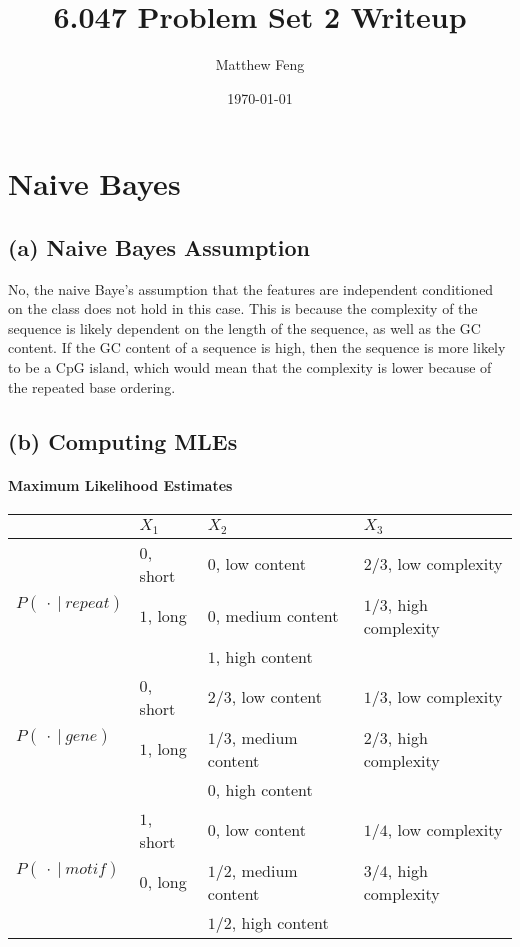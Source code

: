 \documentclass[12pt]{article}
\title{6.047 Problem Set 2 Writeup}
\author{Matthew Feng}
\date{\today}
\begin{document}
\maketitle
\section{Naive Bayes}
\subsection*{(a) Naive Bayes Assumption}
No, the naive Baye's assumption that the features
are independent conditioned on the class does not hold
in this case. This is because the complexity of the
sequence is likely dependent on the length of the
sequence, as well as the GC content. If the GC content
of a sequence is high, then the sequence is more likely
to be a CpG island, which would mean that the complexity
is lower because of the repeated base ordering.

\subsection*{(b) Computing MLEs}

\paragraph{Maximum Likelihood Estimates}

\begin{center}
\begin{tabular} { l | l  l  l }
& $X_1$ & $X_2$ & $X_3$ \\
\hline
\multirow{3}{6em}{$P(\ \cdot\ |\ repeat)$}
& $0$, short & $0$, low content    & $2/3$, low complexity \\
& $1$, long  & $0$, medium content & $1/3$, high complexity\\
&            & $1$, high content   & \\
\hline
\multirow{3}{6em}{$P(\ \cdot\ |\ gene)$}
& $0$, short & $2/3$, low content    & $1/3$, low complexity \\
& $1$, long  & $1/3$, medium content & $2/3$, high complexity\\
&            & $0$,   high content   & \\
\hline
\multirow{3}{6em}{$P(\ \cdot\ |\ motif)$}
& $1$, short & $0$,   low content    & $1/4$, low complexity \\
& $0$, long  & $1/2$, medium content & $3/4$, high complexity\\
&            & $1/2$, high content   & \\
\end{tabular}
\end{center}
\end{document}

